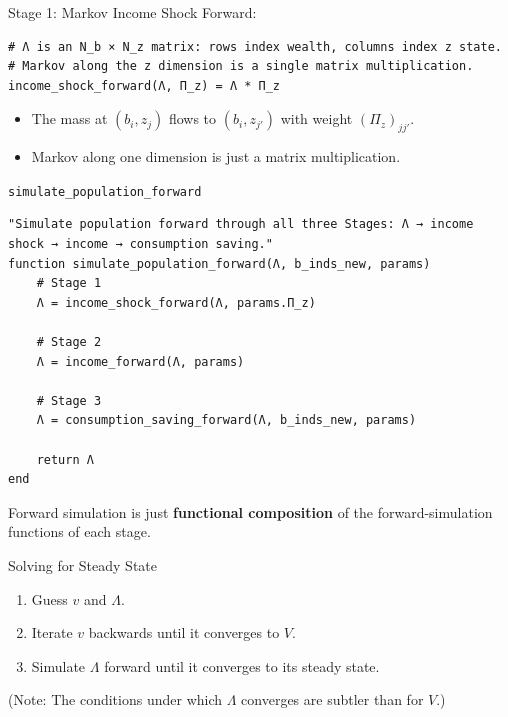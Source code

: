 \documentclass[10pt,aspectratio=169]{beamer}
\begin{document}
\begin{frame}[fragile]{Stage 1: Markov Income Shock}
  Forward:
  \begin{lstlisting}
# Λ is an N_b × N_z matrix: rows index wealth, columns index z state.
# Markov along the z dimension is a single matrix multiplication.
income_shock_forward(Λ, Π_z) = Λ * Π_z
  \end{lstlisting}

  \begin{itemize}
    \item The mass at $(b_i, z_j)$ flows to $(b_i, z_{j'})$ with weight $(\Pi_z)_{j j'}$.
    \item Markov along one dimension is just a matrix multiplication.
  \end{itemize}
\end{frame}

\begin{frame}[fragile]{\texttt{simulate\_population\_forward}}
  \begin{lstlisting}
"Simulate population forward through all three Stages: Λ → income shock → income → consumption saving."
function simulate_population_forward(Λ, b_inds_new, params)
    # Stage 1
    Λ = income_shock_forward(Λ, params.Π_z)

    # Stage 2
    Λ = income_forward(Λ, params)

    # Stage 3
    Λ = consumption_saving_forward(Λ, b_inds_new, params)

    return Λ
end
  \end{lstlisting}
  Forward simulation is just \textbf{functional composition} of the forward-simulation functions of each stage.
\end{frame}


\begin{frame}{Solving for Steady State}
  \begin{enumerate}
    \item Guess $v$ and $\Lambda$.
    \item Iterate $v$ backwards until it converges to $V$.
    \item Simulate $\Lambda$ forward until it converges to its steady state.
  \end{enumerate}
  (Note: The conditions under which $\Lambda$ converges are subtler than for $V$.)
\end{frame}
\end{document}
